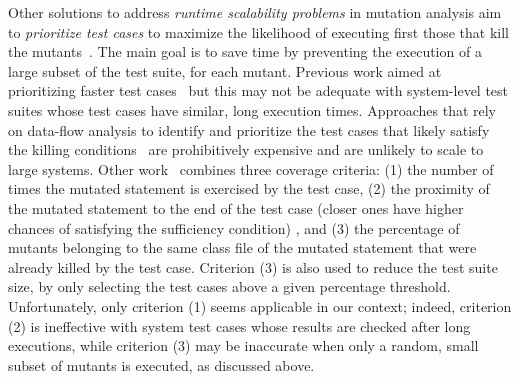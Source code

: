 Other solutions to address \emph{runtime scalability problems} in mutation analysis  aim to \emph{prioritize test cases} to maximize the likelihood of executing first those that kill the mutants~\cite{just2012using,papadakis2011automatically,zhang2013faster}. The main goal is to save time by preventing the execution of a large subset of the test suite, for each mutant.
Previous work aimed at prioritizing faster test cases~\cite{just2012using} but this
 may not be adequate with system-level test suites whose test cases have similar, long execution times.
Approaches that rely on data-flow analysis to identify and prioritize the test cases that likely satisfy the killing conditions~\cite{papadakis2011automatically} are prohibitively expensive and are unlikely to scale to large systems.
Other work~\cite{zhang2013faster} combines three coverage criteria:
(1) the number of times the mutated statement is exercised by the test case,
 (2) the proximity of the mutated statement to the end of the test case
 (closer ones have higher chances of satisfying the sufficiency condition)
 , and (3)
 the percentage of mutants belonging to the same class file of the mutated statement that were already killed by the test case.
Criterion (3) is also used to reduce the test suite size, by only selecting the test cases above a given percentage threshold.
Unfortunately, only criterion (1) seems applicable in our context; indeed, criterion (2) is ineffective with system test cases whose results are checked after long executions, while criterion (3) may be inaccurate when only a random, small subset of mutants is executed, as discussed above.






%
%
%




